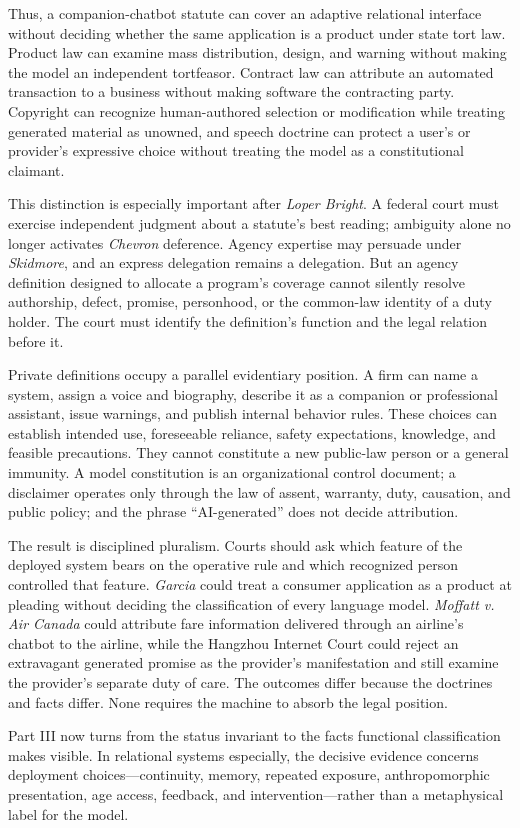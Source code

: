 Thus, a companion-chatbot statute can cover an adaptive relational interface without deciding whether the same application is a product under state tort law. Product law can examine mass distribution, design, and warning without making the model an independent tortfeasor. Contract law can attribute an automated transaction to a business without making software the contracting party. Copyright can recognize human-authored selection or modification while treating generated material as unowned, and speech doctrine can protect a user's or provider's expressive choice without treating the model as a constitutional claimant.

This distinction is especially important after \emph{Loper Bright}. A federal court must exercise independent judgment about a statute's best reading; ambiguity alone no longer activates \emph{Chevron} deference. Agency expertise may persuade under \emph{Skidmore}, and an express delegation remains a delegation. But an agency definition designed to allocate a program's coverage cannot silently resolve authorship, defect, promise, personhood, or the common-law identity of a duty holder. The court must identify the definition's function and the legal relation before it.

Private definitions occupy a parallel evidentiary position. A firm can name a system, assign a voice and biography, describe it as a companion or professional assistant, issue warnings, and publish internal behavior rules. These choices can establish intended use, foreseeable reliance, safety expectations, knowledge, and feasible precautions. They cannot constitute a new public-law person or a general immunity. A model constitution is an organizational control document; a disclaimer operates only through the law of assent, warranty, duty, causation, and public policy; and the phrase ``AI-generated'' does not decide attribution.

The result is disciplined pluralism. Courts should ask which feature of the deployed system bears on the operative rule and which recognized person controlled that feature. \emph{Garcia} could treat a consumer application as a product at pleading without deciding the classification of every language model. \emph{Moffatt v. Air Canada} could attribute fare information delivered through an airline's chatbot to the airline, while the Hangzhou Internet Court could reject an extravagant generated promise as the provider's manifestation and still examine the provider's separate duty of care. The outcomes differ because the doctrines and facts differ. None requires the machine to absorb the legal position.

Part III now turns from the status invariant to the facts functional classification makes visible. In relational systems especially, the decisive evidence concerns deployment choices---continuity, memory, repeated exposure, anthropomorphic presentation, age access, feedback, and intervention---rather than a metaphysical label for the model.

